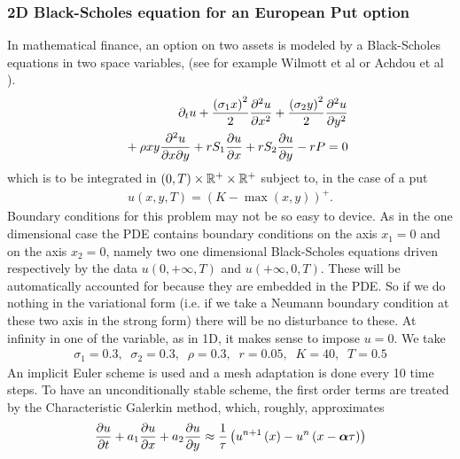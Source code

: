 \documentclass[a4paper,twoside,12pt]{book}
\def\vec#1{\mbox{\boldmath $#1$}}
\def\p{\partial}
\begin{document}
\subsubsection{2D Black-Scholes equation for an European Put option}
In mathematical finance, an option on two assets is modeled by a Black-Scholes equations in two space
variables, (see for example Wilmott et al\cite{wilmott} or Achdou et al \cite{achdou}).
\begin{eqnarray}
\label{eqn:BS-1-1}
 &&\p _t u + \frac{{\left( {\sigma _1 x } \right)^2 }}{2}\frac{{\p ^2 u}}{{\p x^2 }} + \frac{{\left( {\sigma _2 y } \right)^2 }}{2}\frac{{\p ^2 u}}{{\p y^2 }} \\
 &&{\rm{      }} + \rho x y \frac{{\p ^2 u}}{{\p x \p y }} + rS_1 \frac{{\p u}}{{\p x }} + rS_2 \frac{{\p u}}{{\p y }} - rP = 0 \nonumber
\end{eqnarray}
which is to be integrated in $\left( {0,T} \right) \times \mathbb{R}^ +   \times \mathbb{R}^ +$
subject to, in the case of a put
\begin{eqnarray}
\label{eqn:BS-1-2}
u\left( {x , y ,T} \right) = \left( {K - \max \left( {x ,y } \right)} \right)^ +  .
\end{eqnarray}
Boundary conditions for this problem may not be so easy to device.
As in the one dimensional case the PDE contains boundary conditions on the axis
$x_1 = 0$ and on the axis $x_2 = 0$, namely two one dimensional Black-Scholes equations driven
respectively by the data $u\left( {0, + \infty ,T} \right)$
and $u\left( { + \infty ,0,T} \right)$.
These will be automatically accounted for because they are embedded in the PDE.
So if we do nothing in the variational form (i.e. if we take a Neumann boundary condition at
these two axis in the strong form) there will be no disturbance to these.
At infinity in one of the variable, as in 1D, it makes sense to impose $u=0$.
We take
\begin{eqnarray}
\label{eqn:BS-1-5}
\sigma _1  = 0.3,\;\;\sigma _2  = 0.3,\;\;\rho  = 0.3,\;\;r = 0.05,\;\;K = 40,\;\;T = 0.5
\end{eqnarray}
An implicit Euler scheme is used and a mesh adaptation is done every 10 time steps.
To have an unconditionally stable scheme, the first order terms are treated by the
Characteristic Galerkin method, which, roughly, approximates
\begin{eqnarray}
\label{eqn:BS-1-6}
\frac{{\p u}}{{\p t}} + a_1 \frac{{\p u}}{{\p x}} + a_2 \frac{{\p u}}{{\p y}} \approx \frac{1}{{\tau }}\left( {u^{n + 1} \left( x \right) - u^n \left( {x - \vec \alpha\tau } \right)} \right)
\end{eqnarray}
\end{document}
